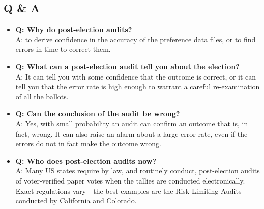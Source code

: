 \documentclass[10pt,a4paper]{article}
\begin{document}
\subsection{Q \& A}
\begin{itemize}
\item {\bf Q: Why do post-election audits?} \\ A: to derive confidence in the accuracy of the preference data files, or to find errors in time to correct them.
\item {\bf Q: What can a post-election audit tell you about the election?} \\ A: It can tell you with some confidence that the outcome is correct, or it can tell you that the error rate is high enough to warrant a careful re-examination of all the ballots.
\item {\bf Q: Can the conclusion of the audit be wrong?} \\ A: Yes, with small probability an audit can confirm an outcome that is, in fact, wrong.  It can also raise an alarm about a large error rate, even if the errors do not in fact make the outcome wrong.
\item {\bf Q: Who does post-election audits now?} \\
A: Many US states require by law, and routinely conduct, post-election audits of voter-verified paper votes when the tallies are conducted electronically.  Exact regulations vary---the best examples are the Risk-Limiting Audits \cite{bretschneider2012risk} conducted by California and Colorado.


\end{itemize}
\end{document}
